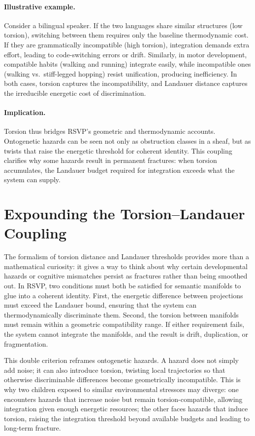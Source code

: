 \documentclass[a4paper,11pt]{article}
\begin{document}
\paragraph{Illustrative example.}
Consider a bilingual speaker. If the two languages share similar structures
(low torsion), switching between them requires only the baseline thermodynamic
cost. If they are grammatically incompatible (high torsion), integration
demands extra effort, leading to code-switching errors or drift. Similarly, in
motor development, compatible habits (walking and running) integrate easily,
while incompatible ones (walking vs.\ stiff-legged hopping) resist unification,
producing inefficiency. In both cases, torsion captures the incompatibility,
and Landauer distance captures the irreducible energetic cost of
discrimination.

\paragraph{Implication.}
Torsion thus bridges RSVP’s geometric and thermodynamic accounts. Ontogenetic
hazards can be seen not only as obstruction classes in a sheaf, but as twists
that raise the energetic threshold for coherent identity. This coupling
clarifies why some hazards result in permanent fractures: when torsion
accumulates, the Landauer budget required for integration exceeds what the
system can supply.

\section{Expounding the Torsion--Landauer Coupling}

The formalism of torsion distance and Landauer thresholds provides more than a
mathematical curiosity: it gives a way to think about why certain developmental
hazards or cognitive mismatches persist as fractures rather than being smoothed
out. In RSVP, two conditions must both be satisfied for semantic manifolds to
glue into a coherent identity. First, the energetic difference between
projections must exceed the Landauer bound, ensuring that the system can
thermodynamically discriminate them. Second, the torsion between manifolds must
remain within a geometric compatibility range. If either requirement fails, the
system cannot integrate the manifolds, and the result is drift, duplication, or
fragmentation.

This double criterion reframes ontogenetic hazards. A hazard does not simply
add noise; it can also introduce torsion, twisting local trajectories so that
otherwise discriminable differences become geometrically incompatible. This is
why two children exposed to similar environmental stressors may diverge: one
encounters hazards that increase noise but remain torsion-compatible, allowing
integration given enough energetic resources; the other faces hazards that
induce torsion, raising the integration threshold beyond available budgets and
leading to long-term fracture.
\end{document}
